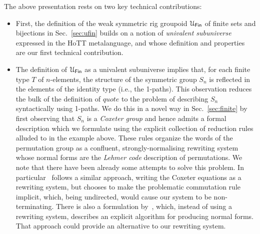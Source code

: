 The above presentation rests on two key technical contributions:
\begin{itemize}
\item First, the definition of the weak symmetric rig groupoid $\UFin$ of finite
  sets and bijections in Sec.~\ref{sec:ufin} builds on a notion of
  \emph{univalent subuniverse} expressed in the HoTT metalanguage, and whose
  definition and properties are our first technical contribution.
\item The definition of $\UFin$ as a univalent subuniverse implies that, for
  each finite type $T$ of $n$-elements, the structure of the symmetric group
  $S_n$ is reflected in the elements of the identity type (i.e., the
  1-paths). This observation reduces the bulk of the definition of
  $\mathit{quote}$ to the problem of describing $S_n$ syntactically using
  1-paths. We do this in a novel way in Sec.~\ref{sec:finite} by first observing
  that $S_n$ is a \emph{Coxeter group} and hence admits a formal description
  which we formulate using the explicit collection of reduction rules alluded to
  in the example above. These rules organize the words of the permutation group
  as a confluent, strongly-normalising rewriting system whose normal forms are
  the \emph{Lehmer code} description of permutations. We note that there have
  been already some attempts to solve this problem. In
  particular~\citet{LAFONT2003257} follows a similar approach, writing the
  Coxeter equations as a rewriting system, but chooses to make the problematic
  commutation rule implicit, which, being undirected, would cause our system to
  be non-terminating. There is also a formulation by~\citet{Hiver-coq}, which,
  instead of using a rewriting system, describes an explicit algorithm for
  producing normal forms. That approach could provide an alternative to our
  rewriting system.
\end{itemize}

